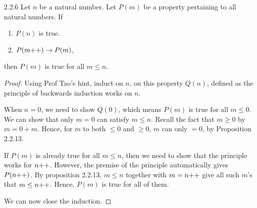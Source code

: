 \begin{exercise}{2.2.6}
	Let $n$ be a natural number. Let $P(m)$ be a property pertaining to all natural numbers. If
	\begin{enumerate}
		\item $P(n)$ is true.
		\item $P(m{+}{+}) \to P(m)$,
	\end{enumerate}
	then $P(m)$ is true for all $m \le n$.
\end{exercise}
\begin{proof}
	Using Prof Tao's hint, induct on $n$, on this property $Q(n)$, defined as the principle of backwards induction works on $n$.
	
	\mybcbox 
	When $n = 0$, we need to show $Q(0)$, which means $P(m)$ is true for all $m \le 0$. We can show that only $m=0$ can satisfy $m \le n$. Recall the fact that $m \ge 0$ by $m = 0+m$. Hence, for $m$ to both $\le 0$ and $\ge 0$, $m$ can only $=0$, by Proposition 2.2.13.
	
	\myisbox 
	If $P(m)$ is already true for all $m \le n$, then we need to show that the principle works for $n{+}{+}$. However, the premise of the principle automatically gives $P(n{+}{+})$. By proposition 2.2.13, $m \le n$ together with $m = n{+}{+}$ give all such $m$'s that $m \le n{+}{+}$. Hence, $P(m)$ is true for all of them.
	
	We can now close the induction.
\end{proof}


